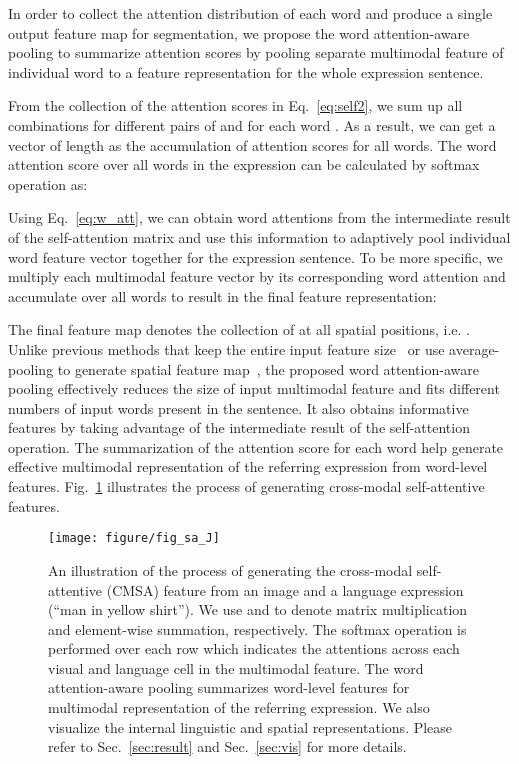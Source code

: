 In order to collect the attention distribution of each word and produce a  single output feature map for segmentation, we propose the word attention-aware pooling to summarize attention scores by pooling separate multimodal feature of individual word to a feature representation for the whole expression sentence.

From the collection of the attention scores  in Eq.~\ref{eq:self2}, we sum up all combinations for different pairs of  and  for each word . As a result, we can get a vector of length  as the accumulation of attention scores for all words.  The word attention score over all words in the expression  can be calculated by softmax operation as:

Using Eq.~\ref{eq:w_att}, we can obtain word attentions from the intermediate result of the self-attention matrix and use this information to adaptively pool individual word feature vector together for the expression sentence. To be more specific, we multiply each multimodal feature vector  by its corresponding word attention  and accumulate  over all words to result in the final feature representation:

The final feature map  denotes the collection of  at all spatial positions, i.e. .
Unlike previous methods that keep the entire input feature size~\cite{wang2018non} or use average-pooling to generate spatial feature map~\cite{ye2019cross}, the proposed word attention-aware pooling effectively reduces the size of input multimodal feature and fits different numbers of input words present in the sentence. It also obtains informative features by taking advantage of the intermediate result of the self-attention operation. The summarization of the attention score for each word help generate effective multimodal representation of the referring expression from word-level features. Fig.~\ref{fig:nl} illustrates the process of generating cross-modal self-attentive features. 


\begin{figure}[htb]
  \centering
  \texttt{[image: figure/fig\_sa\_J]}
    \caption{An illustration of the process of generating the cross-modal self-attentive (CMSA) feature from an image and a language expression (``man in yellow shirt''). We use  and  to denote matrix multiplication and element-wise summation, respectively. The softmax operation is performed over each row which indicates the attentions across each visual and language cell in the multimodal feature. The word attention-aware pooling summarizes word-level features for multimodal representation of the referring expression. We also visualize the internal linguistic and spatial representations. Please refer to Sec.~\ref{sec:result} and Sec.~\ref{sec:vis} for more details.}
\label{fig:nl}
\end{figure}




